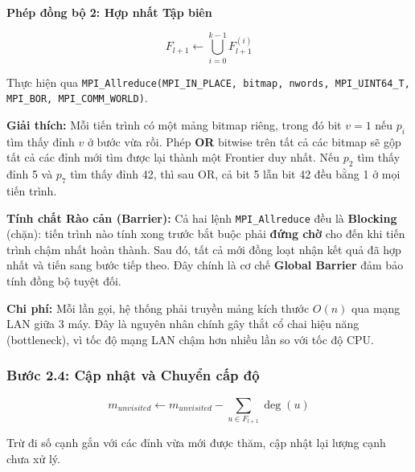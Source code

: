 \documentclass[12pt,a4paper]{article}
\begin{document}
\textbf{Phép đồng bộ 2: Hợp nhất Tập biên}

\begin{equation}
F_{l+1} \leftarrow \bigcup_{i=0}^{k-1} F_{l+1}^{(i)}
\end{equation}

\begin{explain}
Thực hiện qua \texttt{MPI\_Allreduce(MPI\_IN\_PLACE, bitmap, nwords, MPI\_UINT64\_T, MPI\_BOR, MPI\_COMM\_WORLD)}.

\textbf{Giải thích:} Mỗi tiến trình có một mảng bitmap riêng, trong đó bit $v = 1$ nếu $p_i$ tìm thấy đỉnh $v$ ở bước vừa rồi. Phép \textbf{OR} bitwise trên tất cả các bitmap sẽ gộp tất cả các đỉnh mới tìm được lại thành một Frontier duy nhất. Nếu $p_2$ tìm thấy đỉnh 5 và $p_7$ tìm thấy đỉnh 42, thì sau OR, cả bit 5 lẫn bit 42 đều bằng 1 ở mọi tiến trình.
\end{explain}

\textbf{Tính chất Rào cản (Barrier):} Cả hai lệnh \texttt{MPI\_Allreduce} đều là \textbf{Blocking} (chặn): tiến trình nào tính xong trước bắt buộc phải \textbf{đứng chờ} cho đến khi tiến trình chậm nhất hoàn thành. Sau đó, tất cả mới đồng loạt nhận kết quả đã hợp nhất và tiến sang bước tiếp theo. Đây chính là cơ chế \textbf{Global Barrier} đảm bảo tính đồng bộ tuyệt đối.

\begin{explain}
\textbf{Chi phí:} Mỗi lần gọi, hệ thống phải truyền mảng kích thước $O(n)$ qua mạng LAN giữa 3 máy. Đây là nguyên nhân chính gây thắt cổ chai hiệu năng (bottleneck), vì tốc độ mạng LAN chậm hơn nhiều lần so với tốc độ CPU.
\end{explain}

\subsubsection{Bước 2.4: Cập nhật và Chuyển cấp độ}

\begin{equation}
m_{unvisited} \leftarrow m_{unvisited} - \sum_{u \in F_{l+1}} \deg(u)
\end{equation}

\begin{explain}
Trừ đi số cạnh gắn với các đỉnh vừa mới được thăm, cập nhật lại lượng cạnh chưa xử lý.
\end{explain}
\end{document}

